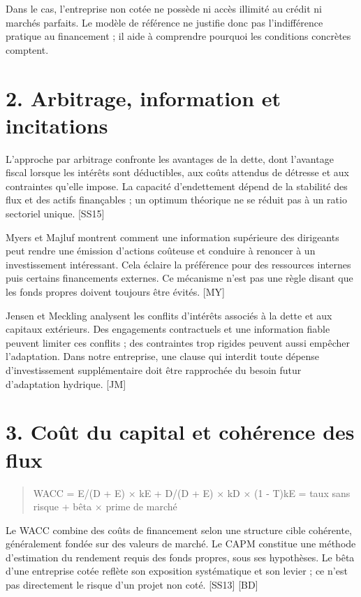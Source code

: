 \documentclass[12pt,a4paper]{article}
\begin{document}
Dans le cas, l’entreprise non cotée ne possède ni accès illimité au crédit ni marchés parfaits. Le modèle de référence ne justifie donc pas l’indifférence pratique au financement ; il aide à comprendre pourquoi les conditions concrètes comptent.

\section*{2. Arbitrage, information et incitations}
L’approche par arbitrage confronte les avantages de la dette, dont l’avantage fiscal lorsque les intérêts sont déductibles, aux coûts attendus de détresse et aux contraintes qu’elle impose. La capacité d’endettement dépend de la stabilité des flux et des actifs finançables ; un optimum théorique ne se réduit pas à un ratio sectoriel unique. [SS15]


Myers et Majluf montrent comment une information supérieure des dirigeants peut rendre une émission d’actions coûteuse et conduire à renoncer à un investissement intéressant. Cela éclaire la préférence pour des ressources internes puis certains financements externes. Ce mécanisme n’est pas une règle disant que les fonds propres doivent toujours être évités. [MY]


Jensen et Meckling analysent les conflits d’intérêts associés à la dette et aux capitaux extérieurs. Des engagements contractuels et une information fiable peuvent limiter ces conflits ; des contraintes trop rigides peuvent aussi empêcher l’adaptation. Dans notre entreprise, une clause qui interdit toute dépense d’investissement supplémentaire doit être rapprochée du besoin futur d’adaptation hydrique. [JM]

\section*{3. Coût du capital et cohérence des flux}

\begin{quote}\small WACC = E/(D + E) $\times$ kE + D/(D + E) $\times$ kD $\times$ (1 - T)\newline kE = taux sans risque + bêta $\times$ prime de marché\end{quote}

Le WACC combine des coûts de financement selon une structure cible cohérente, généralement fondée sur des valeurs de marché. Le CAPM constitue une méthode d’estimation du rendement requis des fonds propres, sous ses hypothèses. Le bêta d’une entreprise cotée reflète son exposition systématique et son levier ; ce n’est pas directement le risque d’un projet non coté. [SS13] [BD]
\end{document}
